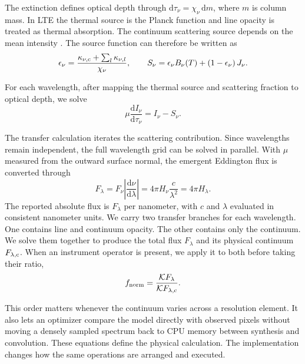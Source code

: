 \begin{EN}
The extinction defines optical depth through
$\mathrm{d}\tau_\nu=\chi_\nu\,\mathrm{d}m$, where $m$ is column mass. In LTE the thermal source
is the Planck function and line opacity is treated as thermal absorption. The
continuum scattering source depends on the mean intensity
\citep{Mihalas1978,Sobeck2011}. The source function
can therefore be written as
\begin{equation}
\epsilon_\nu =
\frac{\kappa_{\nu,{\rm c}}+\sum_l\kappa_{\nu,l}}{\chi_\nu},
\qquad
S_\nu = \epsilon_\nu B_\nu(T)
      + \left(1-\epsilon_\nu\right)J_\nu .
\end{equation}

For each wavelength, after mapping the thermal source and scattering fraction
to optical depth, we solve
\begin{equation}
\mu\frac{\mathrm{d}I_\nu}{\mathrm{d}\tau_\nu}=I_\nu-S_\nu .
\end{equation}

\noindent The transfer calculation iterates the scattering contribution. Since
wavelengths remain independent, the full wavelength grid can be solved in
parallel. With $\mu$ measured from the outward surface normal, the emergent
Eddington flux is converted through
\begin{equation}
F_\lambda
=F_\nu\left|\frac{\mathrm{d}\nu}{\mathrm{d}\lambda}\right|
=4\pi H_\nu\frac{c}{\lambda^2}
=4\pi H_\lambda .
\end{equation}
\noindent The reported absolute flux is $F_\lambda$ per nanometer, with $c$
and $\lambda$ evaluated in consistent nanometer units.
We carry two transfer branches for each wavelength. One
contains line and continuum opacity. The other contains only the continuum.
We solve them together to produce the total flux $F_\lambda$ and its physical
continuum $F_{\lambda,{\rm c}}$. When an instrument operator is present, we
apply it to both before taking their ratio,
\begin{equation}
f_{\rm norm} =
\frac{\mathcal{K}F_\lambda}
     {\mathcal{K}F_{\lambda,{\rm c}}} .
\end{equation}

\noindent This order matters whenever the continuum varies across a resolution element.
It also lets an optimizer compare the model directly with observed pixels
without moving a densely sampled spectrum back to CPU memory between synthesis
and convolution. These equations define the physical calculation. The
implementation changes how the same operations are arranged and executed.
\end{EN}

